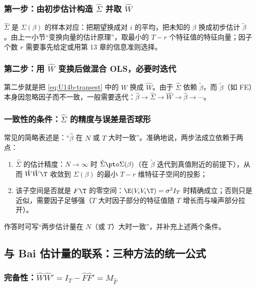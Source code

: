 \subsubsection{第一步：由初步估计构造 \texorpdfstring{$\hat\Sigma$}{Sigma-hat} 并取 \texorpdfstring{$\hat W$}{W-hat}}

$\hat\Sigma$ 是 $\Sigma(\beta)$ 的样本对应：把期望换成对 $i$ 的平均，把未知的 $\beta$ 换成初步估计 $\tilde\beta$。由上一小节“变换向量的估计原理”，取最小的 $T-r$ 个特征值的特征向量；因子个数 $r$ 需要事先给定或用第 13 章的信息准则选择。

\subsubsection{第二步：用 \texorpdfstring{$\hat W$}{W-hat} 变换后做混合 OLS，必要时迭代}

第二步就是把 \eqref{eq:U14b-transest} 中的 $W$ 换成 $\hat W$。由于 $\hat\Sigma$ 依赖 $\tilde\beta$，而 $\tilde\beta$（如 FE）本身因忽略因子而不一致，一般需要迭代：$\hat\beta\to\hat\Sigma\to\hat W\to\hat\beta\to\cdots$。

\subsubsection{一致性的条件：\texorpdfstring{$\hat\Sigma$}{Sigma-hat} 的精度与误差是否球形}

常见的简略表述是：“$\hat\beta$ 在 $N$ 或 $T$ 大时一致”。准确地说，两步法成立依赖于两点：
\begin{enumerate}
  \item $\hat\Sigma$ 的估计精度：$N\to\infty$ 时 $\hat\Sigma\pto\Sigma(\beta)$（在 $\tilde\beta$ 迭代到真值附近的前提下），从而 $\hat W\hat W\T$ 收敛到 $\Sigma(\beta)$ 的最小 $T-r$ 维特征子空间的投影；
  \item 该子空间是否就是 $F\T$ 的零空间：$\E(V_iV_i\T)=\sigma^2I_T$ 时精确成立；否则只是近似，需要因子足够强（$T$ 大时因子部分的特征值随 $T$ 增长而与噪声部分拉开）。
\end{enumerate}
作答时可写“两步估计量在 $N$（或 $T$）大时一致”，并补充上述两个条件。

\subsection{与 Bai 估计量的联系：三种方法的统一公式}\label{sec:U14b-bai}

\subsubsection{完备性：\texorpdfstring{$\hat W\hat W'=I_T-\hat F\hat F'=M_{\hat F}$}{W W' = I - F F' = M\_F}}

